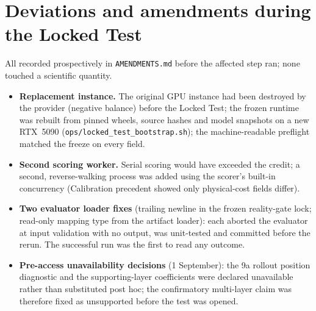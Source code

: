 \documentclass[11pt,a4paper]{article}
\begin{document}
\section{Deviations and amendments during the Locked Test}
\label{app:deviations}
All recorded prospectively in \texttt{AMENDMENTS.md} before the affected step ran; none touched a scientific quantity.
\begin{itemize}
\item \textbf{Replacement instance.} The original GPU instance had been destroyed by the provider (negative balance) before the Locked Test; the frozen runtime was rebuilt from pinned wheels, source hashes and model snapshots on a new RTX~5090 (\texttt{ops/locked\_test\_bootstrap.sh}); the machine-readable preflight matched the freeze on every field.
\item \textbf{Second scoring worker.} Serial scoring would have exceeded the credit; a second, reverse-walking process was added using the scorer's built-in concurrency (Calibration precedent showed only physical-cost fields differ).
\item \textbf{Two evaluator loader fixes} (trailing newline in the frozen reality-gate lock; read-only mapping type from the artifact loader): each aborted the evaluator at input validation with no output, was unit-tested and committed before the rerun. The successful run was the first to read any outcome.
\item \textbf{Pre-access unavailability decisions} (1 September): the 9a rollout position diagnostic and the supporting-layer coefficients were declared unavailable rather than substituted post hoc; the confirmatory multi-layer claim was therefore fixed as unsupported before the test was opened.
\end{itemize}
\end{document}
